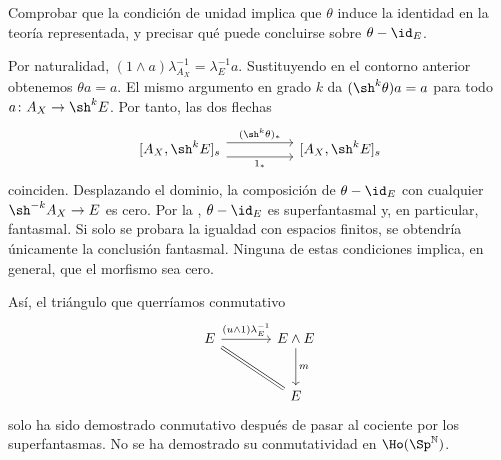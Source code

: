 \begin{ejer}\label{ejer:c24-unidad-fantasma}
Comprobar que la condición de unidad implica que $\theta$ induce la identidad en la teoría representada, y precisar qué puede concluirse sobre $\theta-\id_E$.
\end{ejer}
\begin{sol}
Por naturalidad, $(1\wedge a)\lambda_{A_X}^{-1}=\lambda_E^{-1}a$. Sustituyendo en el contorno anterior obtenemos $\theta a=a$. El mismo argumento en grado $k$ da $(\sh^k\theta)a=a$ para todo $a\colon A_X\to\sh^kE$. Por tanto, las dos flechas
\[
\begin{tikzcd}[column sep=huge]
{[A_X,\sh^kE]_s}\arrow[r,shift left=1.2ex,"(\sh^k\theta)_*"]
\arrow[r,shift right=1.2ex,"1_*"']&{[A_X,\sh^kE]_s}
\end{tikzcd}
\]
coinciden. Desplazando el dominio, la composición de $\theta-\id_E$ con cualquier $\sh^{-k}A_X\to E$ es cero. Por la , $\theta-\id_E$ es superfantasmal y, en particular, fantasmal. Si solo se probara la igualdad con espacios finitos, se obtendría únicamente la conclusión fantasmal. Ninguna de estas condiciones implica, en general, que el morfismo sea cero.
\end{sol}

Así, el triángulo que querríamos conmutativo
\[
\begin{tikzcd}[column sep=large,row sep=large]
E\arrow[r,"(u\wedge1)\lambda_E^{-1}"]\arrow[dr,equal]&E\wedge E\arrow[d,"m"]\\
&E
\end{tikzcd}
\]
solo ha sido demostrado conmutativo después de pasar al cociente por los superfantasmas. No se ha demostrado su conmutatividad en $\Ho(\Sp^{\mathbb N})$.

